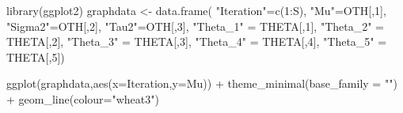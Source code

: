 \documentclass[]{article}
\newenvironment{Shaded}{\begin{snugshade}}{\end{snugshade}}
\newcommand{\KeywordTok}[1]{\textcolor[rgb]{0.94,0.87,0.69}{{#1}}}
\newcommand{\DataTypeTok}[1]{\textcolor[rgb]{0.87,0.87,0.75}{{#1}}}
\newcommand{\DecValTok}[1]{\textcolor[rgb]{0.86,0.86,0.80}{{#1}}}
\newcommand{\StringTok}[1]{\textcolor[rgb]{0.80,0.58,0.58}{{#1}}}
\newcommand{\NormalTok}[1]{\textcolor[rgb]{0.80,0.80,0.80}{{#1}}}
\begin{document}
\begin{Shaded}
\begin{Highlighting}[]
\KeywordTok{library}\NormalTok{(ggplot2)}
\NormalTok{graphdata <-}\StringTok{ }\KeywordTok{data.frame}\NormalTok{(}
              \StringTok{"Iteration"}\NormalTok{=}\KeywordTok{c}\NormalTok{(}\DecValTok{1}\NormalTok{:S), }\StringTok{"Mu"}\NormalTok{=OTH[,}\DecValTok{1}\NormalTok{], }\StringTok{"Sigma2"}\NormalTok{=OTH[,}\DecValTok{2}\NormalTok{], }\StringTok{"Tau2"}\NormalTok{=OTH[,}\DecValTok{3}\NormalTok{], }
              \StringTok{"Theta_1"} \NormalTok{=}\StringTok{ }\NormalTok{THETA[,}\DecValTok{1}\NormalTok{], }\StringTok{"Theta_2"} \NormalTok{=}\StringTok{ }\NormalTok{THETA[,}\DecValTok{2}\NormalTok{], }\StringTok{"Theta_3"} \NormalTok{=}\StringTok{ }\NormalTok{THETA[,}\DecValTok{3}\NormalTok{], }
              \StringTok{"Theta_4"} \NormalTok{=}\StringTok{ }\NormalTok{THETA[,}\DecValTok{4}\NormalTok{], }\StringTok{"Theta_5"} \NormalTok{=}\StringTok{ }\NormalTok{THETA[,}\DecValTok{5}\NormalTok{])}
              
\KeywordTok{ggplot}\NormalTok{(graphdata,}\KeywordTok{aes}\NormalTok{(}\DataTypeTok{x=}\NormalTok{Iteration,}\DataTypeTok{y=}\NormalTok{Mu)) +}
\KeywordTok{theme_minimal}\NormalTok{(}\DataTypeTok{base_family =} \StringTok{""}\NormalTok{) +}\StringTok{ }\KeywordTok{geom_line}\NormalTok{(}\DataTypeTok{colour=}\StringTok{"wheat3"}\NormalTok{)}
\end{Highlighting}
\end{Shaded}
\end{document}
